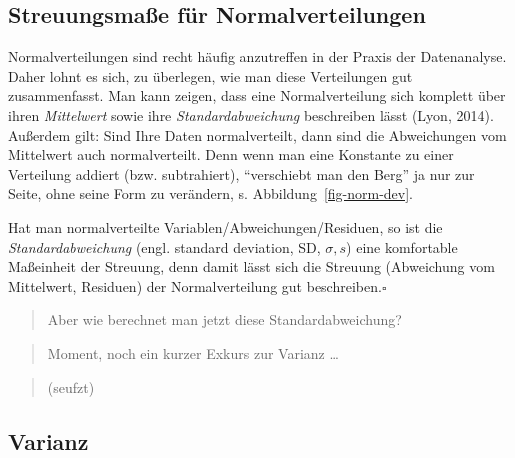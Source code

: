 \documentclass[
  a4paper,
]{scrbook}
\theoremstyle{definition}
\theoremstyle{definition}
\theoremstyle{definition}
\theoremstyle{remark}
\begin{document}
\subsection{Streuungsmaße für
Normalverteilungen}\label{streuungsmauxdfe-fuxfcr-normalverteilungen}

Normalverteilungen sind recht häufig anzutreffen in der Praxis der
Datenanalyse. Daher lohnt es sich, zu überlegen, wie man diese
Verteilungen gut zusammenfasst. Man kann zeigen, dass eine
Normalverteilung sich komplett über ihren \emph{Mittelwert} sowie ihre
\emph{Standardabweichung} beschreiben lässt (Lyon, 2014). Außerdem gilt:
Sind Ihre Daten normalverteilt, dann sind die Abweichungen vom
Mittelwert auch normalverteilt. Denn wenn man eine Konstante zu einer
Verteilung addiert (bzw. subtrahiert), ``verschiebt man den Berg'' ja
nur zur Seite, ohne seine Form zu verändern, s.
Abbildung~\ref{fig-norm-dev}.

\begin{tcolorbox}[enhanced jigsaw, colbacktitle=quarto-callout-note-color!10!white, bottomrule=.15mm, left=2mm, breakable, rightrule=.15mm, coltitle=black, title=\textcolor{quarto-callout-note-color}{\faInfo}\hspace{0.5em}{Hinweis}, colback=white, leftrule=.75mm, titlerule=0mm, opacityback=0, bottomtitle=1mm, toprule=.15mm, arc=.35mm, toptitle=1mm, opacitybacktitle=0.6, colframe=quarto-callout-note-color-frame]

Hat man normalverteilte Variablen/Abweichungen/Residuen, so ist die
\emph{Standardabweichung} (engl. standard deviation, SD, \(\sigma, s\))
eine komfortable Maßeinheit der Streuung, denn damit lässt sich die
Streuung (Abweichung vom Mittelwert, Residuen) der Normalverteilung gut
beschreiben.\(\square\)

\end{tcolorbox}

\begin{quote}
{} Aber wie berechnet man jetzt diese Standardabweichung?
\end{quote}

\begin{quote}
{} Moment, noch ein kurzer Exkurs zur Varianz \ldots{}
\end{quote}

\begin{quote}
{} (seufzt)
\end{quote}

\subsection{Varianz}\label{varianz}
\end{document}
